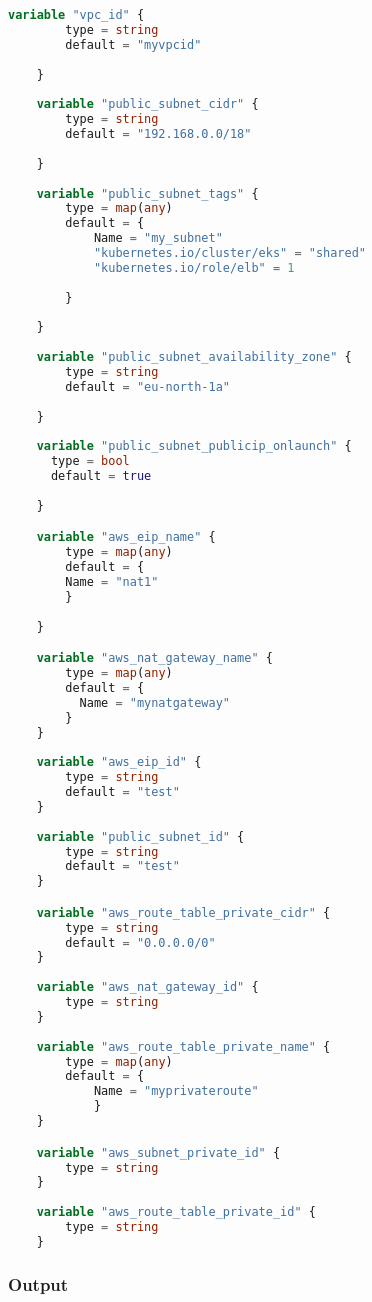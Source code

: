 \begin{lstlisting}[language=terraform]
    variable "vpc_id" {
        type = string
        default = "myvpcid"
    
    }
    
    variable "public_subnet_cidr" {
        type = string
        default = "192.168.0.0/18"
      
    }
    
    variable "public_subnet_tags" {
        type = map(any)
        default = {
            Name = "my_subnet"
            "kubernetes.io/cluster/eks" = "shared"
            "kubernetes.io/role/elb" = 1
            
        }
      
    }
    
    variable "public_subnet_availability_zone" {
        type = string
        default = "eu-north-1a"
      
    }
    
    variable "public_subnet_publicip_onlaunch" {
      type = bool
      default = true
      
    }

    variable "aws_eip_name" {
        type = map(any)
        default = {
        Name = "nat1" 
        }
    
    }

    variable "aws_nat_gateway_name" {
        type = map(any)
        default = {
          Name = "mynatgateway"
        }
    }
      
    variable "aws_eip_id" {
        type = string
        default = "test"
    }
      
    variable "public_subnet_id" {
        type = string 
        default = "test"
    }

    variable "aws_route_table_private_cidr" {
        type = string
        default = "0.0.0.0/0"
    }
    
    variable "aws_nat_gateway_id" {
        type = string
    }
    
    variable "aws_route_table_private_name" {
        type = map(any)
        default = {
            Name = "myprivateroute"
            }
    }

    variable "aws_subnet_private_id" {
        type = string
    }
    
    variable "aws_route_table_private_id" {
        type = string
    }   
\end{lstlisting}

\subsubsection{
{Output}}

